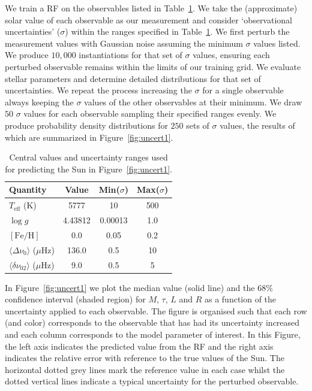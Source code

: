  
 
We train a RF on the observables listed in Table~\ref{tab:sun}.
We take the (approximate) solar value of each observable as our measurement and consider
`observational uncertainties' ($\sigma$) within the ranges specified in Table~\ref{tab:sun}. 
We first perturb the measurement values with Gaussian noise assuming the minimum $\sigma$ values listed. We produce $10,000$ instantiations for that set of $\sigma$ values, ensuring each perturbed observable remains within the limits of our training grid.
We evaluate stellar parameters and determine detailed distributions for that set of uncertainties. We repeat the process increasing the $\sigma$ for a single observable  always keeping the  $\sigma$ values of the other observables at their minimum. 
We draw $50$ $\sigma$ values for each observable sampling their specified ranges evenly.  We produce  probability density distributions for $250$ sets of $\sigma$ values, the results of which are summarized in Figure~\ref{fig:uncert1}.  


 
 \begin{table}
 \centering
    \caption{Central values and uncertainty ranges used for predicting the Sun in Figure~\ref{fig:uncert1}.}
    \begin{tabular}{lccc}
    \hline \hline
Quantity & Value & Min($\sigma$) & Max($\sigma$) \\ \hline 
$T_{\text{eff}}$ (K)  & 5777 & 10  & 500\\
$\log{} g$ &  4.43812 & 0.00013 & 1.0\\
$[\text{Fe/H}]$ & 0.0 & 0.05 & 0.2 \\
$\langle\Delta\nu_0\rangle$ ($\mu$Hz) & 136.0 & 0.5 & 10\\
$\langle\delta\nu_{02}\rangle$ ($\mu$Hz)& 9.0 & 0.5 & 5 \\
\hline
    \end{tabular}
    \label{tab:sun}
\end{table}

 
In Figure~\ref{fig:uncert1} we plot the median value (solid line) and the $68\%$  confidence interval (shaded region)
 for $M$, $\tau$, $L$ and $R$ as a function of the uncertainty applied to each observable. The figure is organised such that each row (and color) corresponds to the observable that has had its uncertainty increased and each column corresponds to the model parameter of interest. In this Figure, the left axis indicates the predicted value from the RF and the right axis indicates the relative error with reference to the true values of the Sun.  The horizontal dotted grey lines mark the reference value in each case whilst the dotted vertical lines indicate a typical uncertainty for the perturbed observable. 

